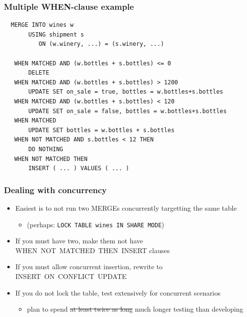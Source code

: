 \documentclass[ignorenonframetext,t]{beamer}
\begin{document}
\begin{frame}[fragile]
  \frametitle{Multiple WHEN-clause example}

  \begin{lstlisting}
  MERGE INTO wines w
       USING shipment s
          ON (w.winery, ...) = (s.winery, ...)

   WHEN MATCHED AND (w.bottles + s.bottles) <= 0
       DELETE
   WHEN MATCHED AND (w.bottles + s.bottles) > 1200
       UPDATE SET on_sale = true, bottles = w.bottles+s.bottles
   WHEN MATCHED AND (w.bottles + s.bottles) < 120
       UPDATE SET on_sale = false, bottles = w.bottles+s.bottles
   WHEN MATCHED
       UPDATE SET bottles = w.bottles + s.bottles
   WHEN NOT MATCHED AND s.bottles < 12 THEN
       DO NOTHING
   WHEN NOT MATCHED THEN
       INSERT ( ... ) VALUES ( ... )
  \end{lstlisting}
\end{frame}

\begin{frame}
  \frametitle{Dealing with concurrency}
  \begin{itemize}
    \item Easiest is to not run two MERGEs concurrently targetting the same table
      \begin{itemize}
	\item (perhaps: \texttt{LOCK TABLE wines IN SHARE MODE})
      \end{itemize}
    \item If you must have two, make them not have WHEN~NOT~MATCHED~THEN~INSERT clauses
    \item If you must allow concurrent insertion, rewrite to INSERT~ON~CONFLICT~UPDATE
      \pause
    \item If you do not lock the table, test extensively for concurrent scenarios
      \begin{itemize}
	\item plan to spend \sout{at least twice as long} much longer testing than developing
      \end{itemize}
  \end{itemize}
\end{frame}
\end{document}
